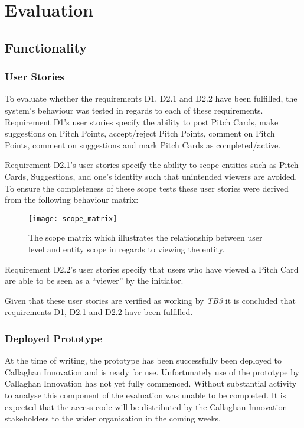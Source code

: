 \chapter{Evaluation}

\section{Functionality}

\subsection{User Stories}
To evaluate whether the requirements D1, D2.1 and D2.2 have been fulfilled, the system's behaviour was tested in regards to each of these requirements. 
Requirement D1's user stories specify the ability to post Pitch Cards, make suggestions on Pitch Points, accept/reject Pitch Points, comment on Pitch Points, comment on suggestions and mark Pitch Cards as completed/active. 

Requirement D2.1's user stories specify the ability to scope entities such as Pitch Cards, Suggestions, and one's identity such that unintended viewers are avoided. To ensure the completeness of these scope tests these user stories were derived from the following behaviour matrix:

\begin{figure}[ht]
    \centering
    \texttt{[image: scope\_matrix]}
    \caption{The scope matrix which illustrates the relationship between user level and entity scope in regards to viewing the entity.}
    \label{fig:architecturescope_matrix_evaluation}
\end{figure}


Requirement D2.2's user stories specify that users who have viewed a Pitch Card are able to be seen as a ``viewer'' by the initiator.

Given that these user stories are verified as working by \textit{TB3} it is concluded that requirements D1, D2.1 and D2.2 have been fulfilled.

\subsection{Deployed Prototype}
At the time of writing, the prototype has been successfully been deployed to Callaghan Innovation and is ready for use. Unfortunately use of the prototype by Callaghan Innovation has not yet fully commenced. Without substantial activity to analyse this component of the evaluation was unable to be completed. It is expected that the access code will be distributed by the Callaghan Innovation stakeholders to the wider organisation in the coming weeks.

